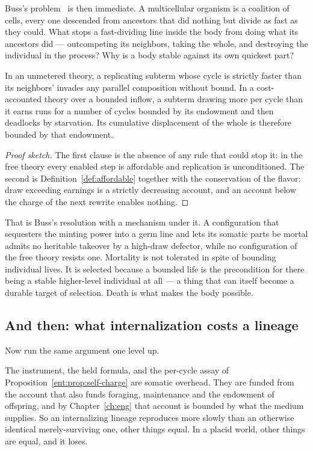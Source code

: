 Buss's problem~\cite{buss1987} is then immediate.
A multicellular organism is a coalition of cells, every one descended
from ancestors that did nothing but divide as fast as they could.
What stops a fast-dividing line inside the body from doing what its
ancestors did --- outcompeting its neighbors, taking the whole, and
destroying the individual in the process?
Why is a body stable against its own quickest part?

\begin{proposition}
\label{suf:prop:buss}
In an unmetered theory, a replicating subterm whose cycle is strictly
faster than its neighbors' invades any parallel composition without
bound.
In a cost-accounted theory over a bounded inflow, a subterm drawing more
per cycle than it earns runs for a number of cycles bounded by its
endowment and then deadlocks by starvation.
Its cumulative displacement of the whole is therefore bounded by that
endowment.
\end{proposition}

\begin{proof}[Proof sketch]
The first clause is the absence of any rule that could stop it: in the
free theory every enabled step is affordable and replication is
unconditioned.
The second is Definition~\ref{def:affordable} together with the
conservation of the flavor: draw exceeding earnings is a strictly
decreasing account, and an account below the charge of the next rewrite
enables nothing.
\end{proof}

That is Buss's resolution with a mechanism under it.
A configuration that sequesters the minting power into a germ line and
lets its somatic parts be mortal admits no heritable takeover by a
high-draw defector, while no configuration of the free theory resists
one.
Mortality is not tolerated in spite of bounding individual lives.
It is selected because a bounded life is the precondition for there being
a stable higher-level individual at all --- a thing that can itself become
a durable target of selection.
Death is what makes the body possible.

\subsection{And then: what internalization costs a lineage}
\label{suf:S5.2}

Now run the same argument one level up.

The instrument, the held formula, and the per-cycle assay of
Proposition~\ref{ent:prop:self-charge} are somatic overhead.
They are funded from the account that also funds foraging, maintenance
and the endowment of offspring, and by Chapter~\ref{ch:eng} that account
is bounded by what the medium supplies.
So an internalizing lineage reproduces more slowly than an otherwise
identical merely-surviving one, other things equal.
In a placid world, other things are equal, and it loses.

